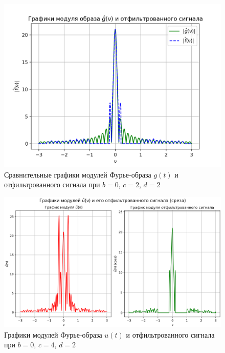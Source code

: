 \begin{figure}[ht!]
    \centering
    \includegraphics[scale=0.55]{media/1 task/specific_freq/Fourier_Image_Comparison_0_2_2_-1,0_-0,22_-2,99_-2,7.png}
    \caption{Сравнительные графики модулей Фурье-образа $g(t)$ и отфильтрованного сигнала при $b=0$,  $c=2$,  $d=2$}
    \label{fig:fourc_0_2_2}
\end{figure}

\begin{figure}[ht!]
    \centering
    \includegraphics[scale=0.55]{media/1 task/specific_freq/Fourier_Image_0_4_2_-1,0_-0,22_-2,99_-2,7.png}
    \caption{Графики модулей Фурье-образа $u(t)$ и отфильтрованного сигнала при $b=0$,  $c=4$,  $d=2$}
    \label{fig:four_0_4_2}
\end{figure}

